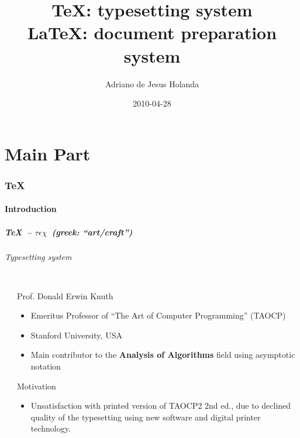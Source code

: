 \documentclass{beamer}
\title{\Large{\TeX: typesetting system \\ \LaTeX: document preparation system}}
\author{Adriano de Jesus Holanda}
\institute[]{Departamento de Computa\c{c}\~ao e Matem\'atica\\
FFCLRP-USP}
\date{2010-04-28}
\begin{document}
\def\imgheight{8} %
\def\imgwidth{6} %
\def\bs{$\backslash$}

\frame{\titlepage}

\part{Main Part}

\section{\TeX}

\subsection{Introduction}

\begin{frame}

  \frametitle{\TeX\ -- {\large $\tau \epsilon \chi$}\ {\tiny (greek: ``art/craft'')}}
  \framesubtitle{Typesetting system}

  \begin{columns}
    
    \begin{column}{2.5cm}
      \def\x{-.3cm}
      \def\y{-1cm}
    \end{column}
    
    \begin{column}{7.5cm}  

      \begin{block}{Prof. Donald Erwin Knuth}
        \begin{itemize}
        \item Emeritus Professor of ``The Art of Computer Programming'' (TAOCP)
        \item Stanford University, USA
        \item Main contributor to the {\bf Analysis of Algorithms} field using asymptotic notation
        
        \end{itemize}
      \end{block}
  
    \begin{alertblock}{Motivation}
      \begin{itemize}
      \item Unsatisfaction with printed version of TAOCP2 2nd ed.,
        due to declined quality of the typesetting using new software
        and digital printer technology.
      \end{itemize}
    \end{alertblock}
    \end{column}
  \end{columns}
\end{frame}
\end{document}
